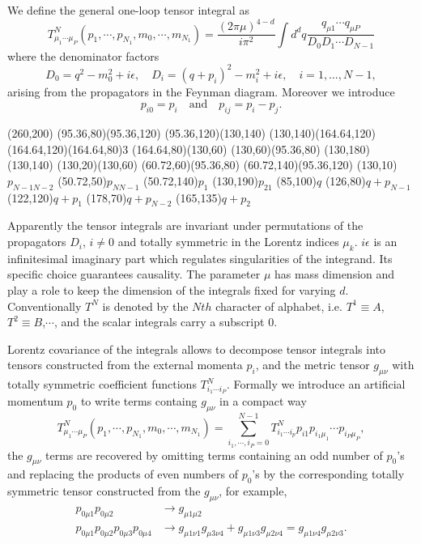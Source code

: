We define the general one-loop tensor integral as
\begin{equation}
T^N_{\mu_1\cdots\mu_P}(p_1,\cdots,p_{N_1},m_0,\cdots,m_{N_1})=\frac{{(2\pi\mu)}^{4-d}}{i\pi^2}\int d^d q\frac{q_{\mu 1}\cdots q_{\mu P}}{D_0 D_1\cdots D_{N-1}}
\end{equation}
where the denominator factors
\begin{equation}
D_0=q^2-m_0^2+i\epsilon,\quad D_i=(q+p_i)^2-m_i^2+i\epsilon,\quad i=1,\dots,N-1,
\end{equation}
arising from the propagators in the Feynman diagram. Moreover we introduce
\begin{equation}
p_{i0}=p_i\quad \text{and} \quad p_{ij}=p_i-p_j.
\end{equation}

\begin{axopicture}(260,200)
	\Line[arrow](95.36,80)(95.36,120)
	\Line[arrow](95.36,120)(130,140)
	\Line[arrow](130,140)(164.64,120)
	\DashLine(164.64,120)(164.64,80){3}	
	\Line[arrow](164.64,80)(130,60)
	\Line[arrow](130,60)(95.36,80)
	\Line[arrow](130,180)(130,140)
	\Line[arrow](130,20)(130,60)
	\Line[arrow](60.72,60)(95.36,80)
	\Line[arrow](60.72,140)(95.36,120)
	\Text(130,10){$p_{N-1 N-2}$}
	\Text(50.72,50){$p_{NN-1}$}
	\Text(50.72,140){$p_1$}
	\Text(130,190){$p_{21}$}
	\Text(85,100){$q$}
	\Text(126,80){$q+p_{N-1}$}
	\Text(122,120){$q+p_{1}$}
	\Text(178,70){$q+p_{N-2}$}
	\Text(165,135){$q+p_2$}
\end{axopicture}

Apparently the tensor integrals are invariant under permutations of the propagators $D_i$, $i\neq 0$ and totally symmetric in the Lorentz indices $\mu_k$. $i\epsilon$ is an infinitesimal imaginary part which regulates singularities of the integrand. Its specific choice guarantees causality. The parameter $\mu$ has mass dimension and play a role to keep the dimension of the integrals fixed for varying $d$. Conventionally $T^N$ is denoted by the $Nth$ character of alphabet, i.e. $T^1\equiv A$, $T^2\equiv B$,$\cdots$, and the scalar integrals carry a subscript $0$.

Lorentz covariance of the integrals allows to decompose tensor integrals into tensors constructed from the external momenta $p_i$, and the metric tensor $g_{\mu\nu}$ with totally symmetric coefficient functions $T^N_{i_1\cdots i_P}$. Formally we introduce an artificial momentum $p_0$ to write terms containg $g_{\mu\nu}$ in a compact way 
\begin{equation}
T^N_{\mu_1\cdots\mu_P}(p_1,\cdots,p_{N_1},m_0,\cdots,m_{N_1})=\sum_{i_1,\cdots,i_P=0}^{N-1}T^N_{i_1\cdots i_p}p_{i1}p_{i_1\mu_1}\cdots p_{i_P\mu_P},
\end{equation}
the $g_{\mu\nu}$ terms are recovered by omitting terms containing an odd number of $p_0$'s and replacing the products of even numbers of $p_0$'s by the corresponding totally symmetric tensor constructed from the $g_{\mu\nu}$, for example,
\begin{align}
p_{0\mu 1}p_{0\mu 2} &\to g_{\mu 1\mu 2}\nonumber\\
p_{0\mu 1}p_{0\mu 2}p_{0\mu 3}p_{0\mu 4} &\to g_{\mu 1\nu 1}g_{\mu 3\nu 4}+g_{\mu 1\nu 3}g_{\mu 2\nu 4}=g_{\mu 1\nu 4}g_{\mu 2\nu 3}.
\end{align}

